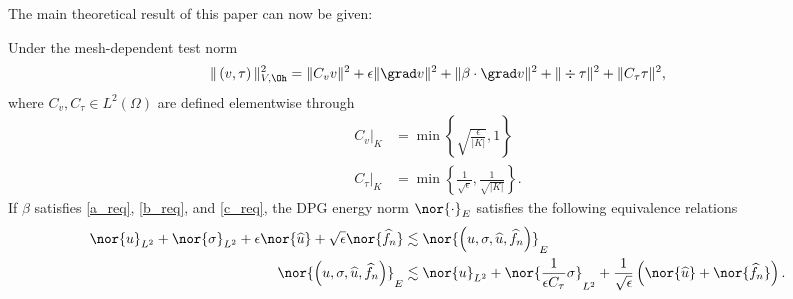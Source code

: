 The main theoretical result of this paper can now be given:
\begin{lemma}
Under the mesh-dependent test norm
\[
\|\left(v,\tau\right)\|_{V,\Oh}^2 = \|C_vv\|^2 + \epsilon \|\grad v\|^2 + \|\beta \cdot \grad v\|^2 + \| \div \tau\|^2 + \|C_\tau\tau\|^2,
\]
where $C_v, C_{\tau}\in L^2(\Omega)$ are defined elementwise through
\begin{align*}
\left.C_v\right |_K &= \min\left\{\sqrt{\frac{\epsilon}{|K|}},1\right\}\\
\left.C_{\tau}\right |_K &= \min\left\{\frac{1}{\sqrt{\epsilon}},\frac{1}{\sqrt{|K|}}\right\}.
\end{align*}
If $\beta$ satisfies \eqref{a_req}, \eqref{b_req}, and \eqref{c_req}, the DPG energy norm $\nor{\cdot}_E$ satisfies the following equivalence relations
\begin{align*}
\nor{u}_{L^2} + \nor{\sigma}_{L^2} + \epsilon\nor{\widehat{u}} + \sqrt{\epsilon}\nor{\widehat{f}_n} 
&\lesssim \nor{\left(u,\sigma, \widehat{u},\widehat{f}_n\right)}_E \\ 
\nor{\left(u,\sigma, \widehat{u},\widehat{f}_n\right)}_E &\lesssim \nor{u}_{L^2} + \nor{\frac{1}{\epsilon C_\tau} \sigma}_{L^2} + \frac{1}{\sqrt{\epsilon}} \left(\nor{\widehat{u}} + \nor{\widehat{f}_n}\right).
\end{align*}
\end{lemma}

